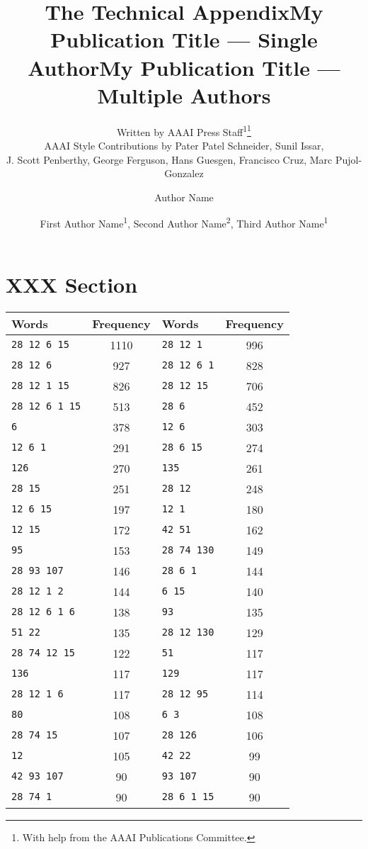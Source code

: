 \documentclass[letterpaper]{article} %
\title{The Technical Appendix}
\author{
    Written by AAAI Press Staff\textsuperscript{\rm 1}\thanks{With help from the AAAI Publications Committee.}\\
    AAAI Style Contributions by Pater Patel Schneider,
    Sunil Issar,\\
    J. Scott Penberthy,
    George Ferguson,
    Hans Guesgen,
    Francisco Cruz\equalcontrib,
    Marc Pujol-Gonzalez\equalcontrib
}
\title{My Publication Title --- Single Author}
\author {
    Author Name
}
\title{My Publication Title --- Multiple Authors}
\author {
    First Author Name\textsuperscript{\rm 1},
    Second Author Name\textsuperscript{\rm 2},
    Third Author Name\textsuperscript{\rm 1}
}
\begin{document}
\maketitle

\section{XXX Section}

\begin{table}[th]
\centering
\small
\begin{tabular}{lclc}
\hline
\textbf{Words} & \textbf{Frequency} & \textbf{Words} & \textbf{Frequency}\\
\hline
\verb|28 12 6 15| & 1110 & \verb|28 12 1| & 996 \\
\verb|28 12 6| & 927 & \verb|28 12 6 1| & 828 \\
\verb|28 12 1 15| & 826 & \verb|28 12 15| & 706 \\
\verb|28 12 6 1 15| & 513 & \verb|28 6| & 452 \\
\verb|6| & 378 & \verb|12 6| & 303 \\
\verb|12 6 1| & 291 & \verb|28 6 15| & 274 \\
\verb|126| & 270 & \verb|135| & 261 \\
\verb|28 15| & 251 & \verb|28 12| & 248 \\
\verb|12 6 15| & 197 & \verb|12 1| & 180 \\
\verb|12 15| & 172 & \verb|42 51| & 162 \\
\verb|95| & 153 & \verb|28 74 130| & 149 \\
\verb|28 93 107| & 146 & \verb|28 6 1| & 144 \\
\verb|28 12 1 2| & 144 & \verb|6 15| & 140 \\
\verb|28 12 6 1 6| & 138 & \verb|93| & 135 \\
\verb|51 22| & 135 & \verb|28 12 130| & 129 \\
\verb|28 74 12 15| & 122 & \verb|51| & 117 \\
\verb|136| & 117 & \verb|129| & 117 \\
\verb|28 12 1 6| & 117 & \verb|28 12 95| & 114 \\
\verb|80| & 108 & \verb|6 3| & 108 \\
\verb|28 74 15| & 107 & \verb|28 126| & 106 \\
\verb|12| & 105 & \verb|42 22| & 99 \\
\verb|42 93 107| & 90 & \verb|93 107| & 90 \\
\verb|28 74 1| & 90 & \verb|28 6 1 15| & 90 \\

\end{tabular}
\end{table}
\end{document}
